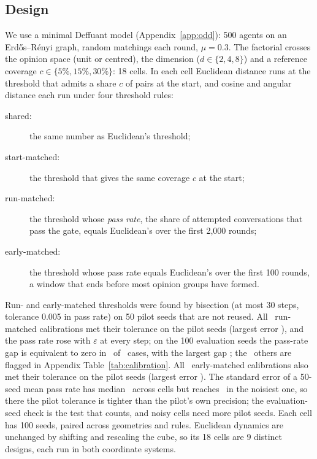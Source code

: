 \documentclass[11pt]{article}
\begin{document}
\subsection{Design}
We use a minimal Deffuant model (Appendix~\ref{app:odd}): 500 agents on an Erd\H{o}s--R\'enyi graph, random matchings each round, $\mu = 0.3$.
The factorial crosses the opinion space (unit or centred), the dimension ($d \in \{2,4,8\}$) and a reference coverage $c \in \{5\%, 15\%, 30\%\}$: 18 cells.
In each cell Euclidean distance runs at the threshold that admits a share $c$ of pairs at the start, and cosine and angular distance each run under four threshold rules:
\begin{description}
\item[shared:] the same number as Euclidean's threshold;
\item[start-matched:] the threshold that gives the same coverage $c$ at the start;
\item[run-matched:] the threshold whose \emph{pass rate}, the share of attempted conversations that pass the gate, equals Euclidean's over the first 2{,}000 rounds;
\item[early-matched:] the threshold whose pass rate equals Euclidean's over the first 100 rounds, a window that ends before most opinion groups have formed.
\end{description}
Run- and early-matched thresholds were found by bisection (at most 30 steps, tolerance 0.005 in pass rate) on 50 pilot seeds that are not reused.
All \VCalTotal\ run-matched calibrations met their tolerance on the pilot seeds (largest error \VCalMaxErr), and the pass rate rose with $\varepsilon$ at every step; on the 100 evaluation seeds the pass-rate gap is equivalent to zero in \VCalEvalEquiv\ of \VCalTotal\ cases, with the largest gap \VCalEvalMax; the \VCalEvalMiss\ others are flagged in Appendix Table~\ref{tab:calibration}.
All \VEarlyCalTotal\ early-matched calibrations also met their tolerance on the pilot seeds (largest error \VEarlyCalMaxErr).
The standard error of a 50-seed mean pass rate has median \VPilotSEMed\ across cells but reaches \VPilotSEMax\ in the noisiest one, so there the pilot tolerance is tighter than the pilot's own precision; the evaluation-seed check is the test that counts, and noisy cells need more pilot seeds.
Each cell has 100 seeds, paired across geometries and rules.
Euclidean dynamics are unchanged by shifting and rescaling the cube, so its 18 cells are 9 distinct designs, each run in both coordinate systems.
\end{document}
